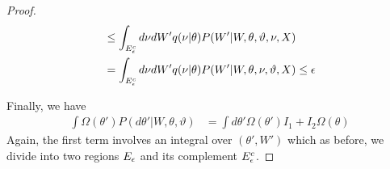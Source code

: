 \begin{proof}
\begin{align*}
  &\le \int_{E^c_{\epsilon}} d\nu dW'
  q(\nu | \theta) P(W' | W, \theta, \vartheta, \nu, X) \\
 &= \int_{E^c_{\epsilon}} d\nu dW'
 q(\nu | \theta) P(W' |  W, \theta, \nu, \vartheta, X)
\le \epsilon
\end{align*}

Finally, we have
\begin{align*}
  \int \Omega(\theta') P(d\theta'| W, \theta, \vartheta)
  &= \int d\theta' \Omega(\theta') I_1 + I_2 \Omega(\theta)
\end{align*}
Again, the first term involves an integral over $(\theta',W')$ which as
before, we divide into two regions $E_\epsilon$ and its complement
$E^c_\epsilon$.


\end{proof}

